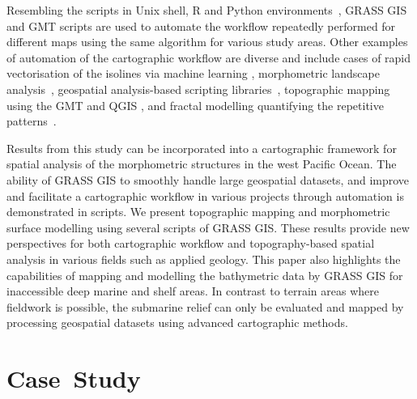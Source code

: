 \documentclass[technologies,article,accept,pdftex,moreauthors]{Definitions/mdpi}
\begin{document}
{Resembling the} scripts in Unix shell, R and Python environments~\cite{jimaging8120317}, GRASS GIS and GMT scripts{ }are used to automate the workflow repeatedly performed for different maps using the same algorithm for various study areas. Other examples of automation of the cartographic workflow are diverse and include cases of rapid vectorisation of the isolines via machine learning \cite{Lemenkova2020e}, morphometric landscape analysis~\cite{Clarke,Sofia}, geospatial analysis-based scripting libraries~\cite{su142315966}, topographic mapping using the GMT and {QGIS} \cite{LemenkovaDebeir2022JAES}, and fractal modelling quantifying the repetitive patterns~\cite{Malinverno}. 

Results from this study can be incorporated into a cartographic framework for spatial analysis of the morphometric structures in the west Pacific Ocean. The ability of GRASS GIS to smoothly handle large geospatial datasets, and improve and facilitate a cartographic workflow in various projects through automation is demonstrated in scripts. We present topographic mapping and morphometric surface modelling using several scripts of GRASS GIS. These results provide new perspectives for both cartographic workflow and topography-based spatial analysis in various fields such as applied geology. This paper also highlights the capabilities of mapping and modelling the bathymetric data by GRASS GIS for inaccessible deep marine and shelf areas. In contrast to terrain areas where fieldwork is possible, the submarine relief can only be evaluated and mapped by processing geospatial datasets using advanced cartographic methods.

\section{Case~Study}

\end{document}
